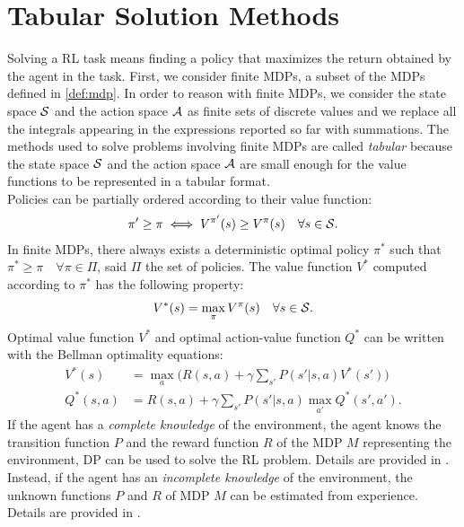 \section{Tabular Solution Methods}\label{sec:tabmet}
Solving a \ac{RL} task means finding a policy that maximizes the return obtained by the agent in the task. First, we consider finite \ac{MDPs}, a subset of the \ac{MDPs} defined in \ref{def:mdp}. In order to reason with finite \ac{MDPs}, we consider the state space $\mathcal{S}$ and the action space $\mathcal{A}$ as finite sets of discrete values and we replace all the integrals appearing in the expressions reported so far with summations. The methods used to solve problems involving finite \ac{MDPs} are called \emph{tabular} because the state space $\mathcal{S}$ and the action space $\mathcal{A}$ are small enough for the value functions to be represented in a tabular format.\\
\newline
Policies can be partially ordered according to their value function: 
\begin{align}
\pi' \geq \pi \iff V^{\pi'}(s) \geq V^{\pi}(s) \quad \forall s \in \mathcal{S}. \label{eq:ordpol}
\end{align} 
In finite \ac{MDPs}, there always exists a deterministic optimal policy $\pi^{*}$ such that $\pi^{*} \geq \pi \quad \forall \pi \in \Pi$, said $\Pi$ the set of policies. The value function $V^{*}$ computed according to $\pi^{*}$ has the following property:
\begin{align} V^{*}(s) = \max_{\pi}V^{\pi}(s) \quad \forall s \in \mathcal{S}. \end{align}
Optimal value function $V^{*}$ and optimal action-value function $Q^{*}$ can be written with the Bellman optimality equations:
\begin{align}
V^{*}(s) &= \max_a \Big( R(s,a) + \gamma \sum_{s'}P(s'|s,a)   V^{*}(s') \Big)\\
Q^{*}(s,a) &= R(s,a) + \gamma \sum_{s'}P(s'|s,a) \max_{a'} Q^{*}(s', a').
\end{align}
If the agent has a \emph{complete knowledge} of the environment, \ie the agent knows the transition function $P$ and the reward function $R$ of the \ac{MDP} $M$ representing the environment, \acf{DP} can be used to solve the \ac{RL} problem. Details are provided in . Instead, if the agent has an \emph{incomplete knowledge} of the environment, the unknown functions $P$ and $R$ of \ac{MDP} $M$ can be estimated from experience. Details are provided in .\\
